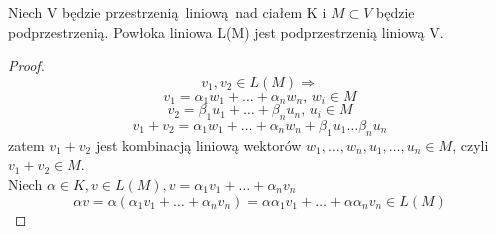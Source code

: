 \begin{theorem}
    Niech V będzie przestrzenią liniową nad ciałem K i $M \subset V$ będzie podprzestrzenią. Powłoka liniowa L(M) jest podprzestrzenią liniową V.
    \begin{proof}
        \begin{equation*}
            v_1,v_2 \in L(M) \Longrightarrow
        \end{equation*}
        \begin{equation*}
            v_1 = \alpha_1 w_1 + \ldots + \alpha_n w_n, \, w_i \in M
        \end{equation*}
        \begin{equation*}
            v_2 = \beta_1 u_1 + \ldots + \beta_n u_n, \, u_i \in M
        \end{equation*}
        \begin{equation*}
            v_1 + v_2 = \alpha_1 w_1 + \ldots + \alpha_n w_n + \beta_1 u_1 \ldots \beta_n u_n 
        \end{equation*}
        zatem $v_1 + v_2$ jest kombinacją liniową wektorów $w_1,\ldots,w_n,u_1,\ldots,u_n \in M$, czyli $v_1 + v_2 \in M$.\\
        Niech $\alpha \in K, v \in L(M), v = \alpha_1 v_1+\ldots +\alpha_n v_n$
        \begin{equation*}
            \alpha v = \alpha(\alpha_1 v_1+\ldots +\alpha_n v_n) = \alpha\alpha_1 v_1+\ldots + \alpha\alpha_n v_n \in L(M)
        \end{equation*}
    \end{proof}
\end{theorem}
